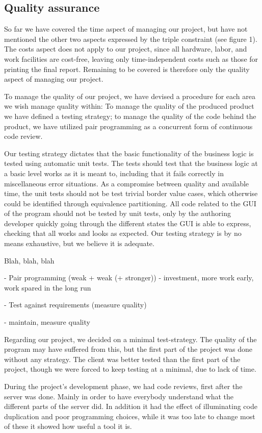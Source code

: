 \subsection{Quality assurance}

So far we have covered the time aspect of managing our project, but have not mentioned the other two aspects expressed by the triple constraint (see figure 1).
The costs aspect does not apply to our project, since all hardware, labor, and work facilities are cost-free, leaving only time-independent costs such as those for printing the final report.
Remaining to be covered is therefore only the quality aspect of managing our project.

To manage the quality of our project, we have devised a procedure for each area we wish manage quality within: To manage the quality of the produced product we have defined a testing strategy; to manage the quality of the code behind the product, we have utilized pair programming as a concurrent form of continuous code review.

Our testing strategy dictates that the basic functionality of the business logic is tested using automatic unit tests. The tests should test that the business logic at a basic level works as it is meant to, including that it fails correctly in miscellaneous error situations.
As a compromise between quality and available time, the unit tests should not be test trivial border value cases, which otherwise could be identified through equivalence partitioning.
All code related to the GUI of the program should not be tested by unit tests, only by the authoring developer quickly going through the different states the GUI is able to express, checking that all works and looks as expected.
Our testing strategy is by no means exhaustive, but we believe it is adequate.



Blah, blah, blah

- Pair programming (weak + weak (+ stronger)) - investment, more work early, work spared in the long run

- Test against requirements (measure quality)


- maintain, measure quality






Regarding our project, we decided on a minimal test-strategy. The quality of the program may have suffered from this, but the first part of the project was done without any strategy. The client was better tested than the first part of the project, though we were forced to keep testing at a minimal, due to lack of time.

During the project's development phase, we had code reviews, first after the server was done. Mainly in order to have everybody understand what the different parts of the server did. In addition it had the effect of illuminating code duplication and poor programming choices, while it was too late to change most of these it showed how useful a tool it is.